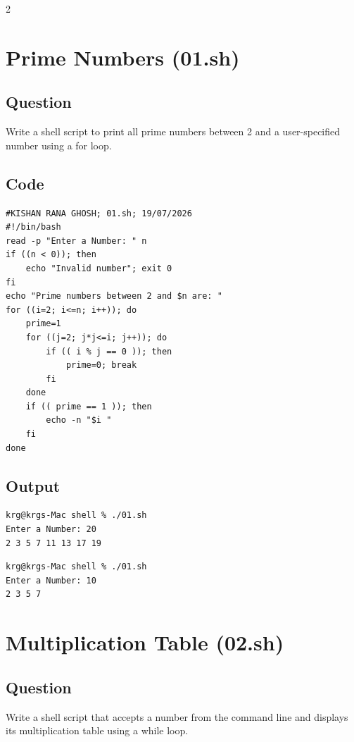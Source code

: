 \documentclass[a4paper,12pt]{article}
\begin{document}
\begin{multicols}{2}

\section{Prime Numbers (01.sh)}
\subsection*{Question}
Write a shell script to print all prime numbers between 2 and a user-specified number using a for loop.

\subsection*{Code}
\begin{lstlisting}[style=bashstyle]
#KISHAN RANA GHOSH; 01.sh; 19/07/2026
#!/bin/bash
read -p "Enter a Number: " n
if ((n < 0)); then 
    echo "Invalid number"; exit 0
fi    
echo "Prime numbers between 2 and $n are: "
for ((i=2; i<=n; i++)); do
    prime=1
    for ((j=2; j*j<=i; j++)); do
        if (( i % j == 0 )); then
            prime=0; break
        fi
    done
    if (( prime == 1 )); then
        echo -n "$i "
    fi
done
\end{lstlisting}

\subsection*{Output}
\begin{lstlisting}[style=outputstyle]
krg@krgs-Mac shell % ./01.sh
Enter a Number: 20
2 3 5 7 11 13 17 19 
\end{lstlisting}
\begin{lstlisting}[style=outputstyle]
krg@krgs-Mac shell % ./01.sh
Enter a Number: 10
2 3 5 7 
\end{lstlisting}

\columnbreak

\section{Multiplication Table (02.sh)}
\subsection*{Question}
Write a shell script that accepts a number from the command line and displays its multiplication table using a while loop.


\end{multicols}
\end{document}

